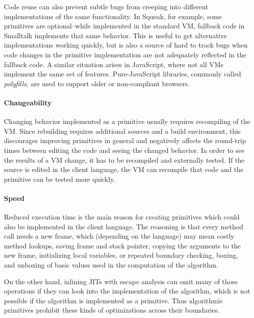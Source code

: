 \documentclass[
10pt,          %
]{sigplanconf}
\begin{document}
Code reuse can also prevent subtle bugs from creeping into different
implementations of the same functionality. In Squeak, for example,
some primitives are optional\---while implemented in the standard
\ac{VM}, fallback code in Smalltalk implements that same
behavior. This is useful to get alternative implementations working
quickly, but is also a source of hard to track bugs when code changes
in the primitive implementation are not adequately reflected in the
fallback code. A similar situation arises in JavaScript, where not all
\acp{VM} implement the same set of features. Pure-JavaScript
libraries, commonly called \emph{polyfills}, are used to support older
or non-compliant browsers.

\paragraph{Changeability}
Changing behavior implemented as a primitive usually requires recompiling of
the \ac{VM}. Since rebuilding requires additional sources and a build
environment, this discourages improving primitives in general and negatively
affects the round-trip times between editing the code and seeing the changed
behavior. In order to see the results of a \ac{VM} change, it has to be
recompiled and externally tested. If the source is edited in the client
language, the \ac{VM} can recompile that code and the primitive can be tested
more quickly.

\paragraph{Speed}
Reduced execution time is the main reason for creating primitives
which could also be implemented in the client language. The reasoning
is that every method call needs a new frame, which (depending on the
language) may mean costly method lookups, saving frame and stack
pointer, copying the arguments to the new frame, initializing local
variables, or repeated boundary checking, boxing, and unboxing of
basic values used in the computation of the algorithm.

On the other hand, inlining \acp{JIT} with escape analysis can omit many of
those operations if they can look into the implementation of the algorithm,
which is not possible if the algorithm is implemented as a primitive. Thus
algorithmic primitives prohibit these kinds of optimizations across their
boundaries.
\end{document}
